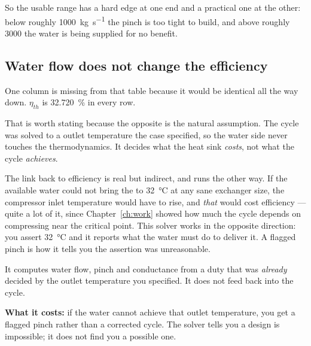\documentclass[11pt,a4paper]{report}
\begin{document}
So the usable range has a hard edge at one end and a practical one at the
other: below roughly \SI{1000}{\kilogram\per\second} the pinch is too tight
to build, and above roughly \SI{3000}{} the water is being supplied for no
benefit.

\subsection{Water flow does not change the efficiency}

One column is missing from that table because it would be identical all the
way down. $\eta_{th}$ is \SI{32.720}{\percent} in every row.

That is worth stating because the opposite is the natural assumption. The
cycle was solved to a  outlet temperature the case specified, so the
water side never touches the thermodynamics. It decides what the heat sink
\emph{costs}, not what the cycle \emph{achieves}.

The link back to efficiency is real but indirect, and runs the other way. If
the available water could not bring the  to \SI{32}{\celsius} at any
sane exchanger size, the compressor inlet temperature would have to rise,
and \emph{that} would cost efficiency --- quite a lot of it, since
Chapter~\ref{ch:work} showed how much the cycle depends on compressing near
the critical point. This solver works in the opposite direction: you assert
\SI{32}{\celsius} and it reports what the water must do to deliver it. A
flagged pinch is how it tells you the assertion was unreasonable.

\begin{caveat}[title={Caveat: the coolant side still does not feed back}]
It computes water flow, pinch and conductance from a duty that was
\emph{already} decided by the  outlet temperature you specified. It
does not feed back into the cycle.

\textbf{What it costs:} if the water cannot achieve that outlet temperature,
you get a flagged pinch rather than a corrected cycle. The solver tells you
a design is impossible; it does not find you a possible one.
\end{caveat}
\end{document}
